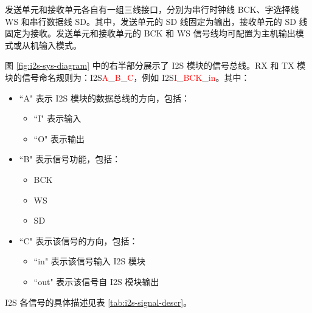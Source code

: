 \documentclass[main\_\_CN.tex]{subfiles}
\begin{document}
发送单元和接收单元各自有一组三线接口，分别为串行时钟线 BCK、字选择线 WS 和串行数据线 SD。其中，发送单元的 SD 线固定为输出，接收单元的 SD 线固定为接收。发送单元和接收单元的 BCK 和 WS 信号线均可配置为主机输出模式或从机输入模式。

图 \ref{fig:i2s-sys-diagram} 中的右半部分展示了 I2S 模块的信号总线。RX 和 TX 模块的信号命名规则为：I2S\textcolor{red}{A}\_\textcolor{red}{B}\_\textcolor{red}{C}，例如 I2S\textcolor{red}{I}\_\textcolor{red}{BCK}\_\textcolor{red}{in}。其中：

\begin{itemize}
    \item ``A" 表示 I2S 模块的数据总线的方向，包括：
    \begin{itemize}
        \item ``I" 表示输入
        \item ``O" 表示输出
    \end{itemize}
    \item ``B" 表示信号功能，包括：
    \begin{itemize}
        \item BCK
        \item WS
        \item SD
    \end{itemize}
    \item ``C" 表示该信号的方向，包括：
    \begin{itemize}
        \item ``in" 表示该信号输入 I2S 模块
        \item ``out" 表示该信号自 I2S 模块输出
    \end{itemize}
\end{itemize}

I2S 各信号的具体描述见表 \ref{tab:i2s-signal-descr}。
\end{document}
